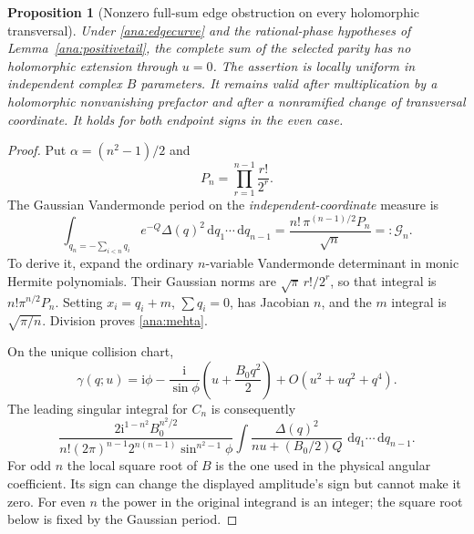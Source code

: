\documentclass[11pt]{article}
\numberwithin{equation}{section}
\newtheorem{proposition}[theorem]{Proposition}
\theoremstyle{definition}
\newcommand{\ii}{\mathrm i}
\newcommand{\dd}{\,\mathrm d}
\begin{document}
\begin{proposition}[Nonzero full-sum edge obstruction on every
holomorphic transversal]\label{ana:positive}
Under \eqref{ana:edgecurve} and the rational-phase hypotheses of
Lemma~\ref{ana:positivetail}, the complete sum of the selected
parity has no holomorphic extension through \(u=0\).
The assertion is locally uniform in independent complex \(B\)
parameters. It remains valid after multiplication by a
holomorphic nonvanishing prefactor and after a nonramified change
of transversal coordinate. It holds for both endpoint signs in
the even case.
\end{proposition}
\begin{proof}
Put \(\alpha=(n^2-1)/2\) and
\[
 P_n=\prod_{r=1}^{n-1}\frac{r!}{2^r}.
\]
The Gaussian Vandermonde period on the \emph{independent-coordinate}
measure is
\begin{equation}\label{ana:mehta}
 \int_{q_n=-\sum_{i<n}q_i}e^{-Q}\Delta(q)^2
               \dd q_1\cdots\dd q_{n-1}
 =\frac{n!\,\pi^{(n-1)/2}P_n}{\sqrt n}=:\mathcal G_n.
\end{equation}
To derive it, expand the ordinary \(n\)-variable Vandermonde
determinant in monic Hermite polynomials. Their Gaussian norms are
\(\sqrt\pi\,r!/2^r\), so that integral is
\(n!\pi^{n/2}P_n\). Setting \(x_i=q_i+m\), \(\sum q_i=0\),
has Jacobian \(n\), and the \(m\) integral is \(\sqrt{\pi/n}\).
Division proves \eqref{ana:mehta}.

On the unique collision chart,
\[
 \gamma(q;u)=\ii\phi-\frac{\ii}{\sin\phi}
       \left(u+\frac{B_0q^2}{2}\right)
       +O(u^2+u q^2+q^4).
\]
The leading singular integral for \(C_n\) is consequently
\begin{equation}\label{ana:firstintegral}
 \frac{2\ii^{1-n^2}B_0^{n^2/2}}
 {n!(2\pi)^{n-1}2^{n(n-1)}\sin^{n^2-1}\phi}
 \int\frac{\Delta(q)^2}{nu+(B_0/2)Q}\,
             \dd q_1\cdots\dd q_{n-1}.
\end{equation}
For odd \(n\) the local square root of \(B\) is the one used in
the physical angular coefficient. Its sign can change the displayed
amplitude's sign but cannot make it zero. For even \(n\) the
power in the original integrand is an integer; the square root
below is fixed by the Gaussian period.


\end{proof}
\end{document}
